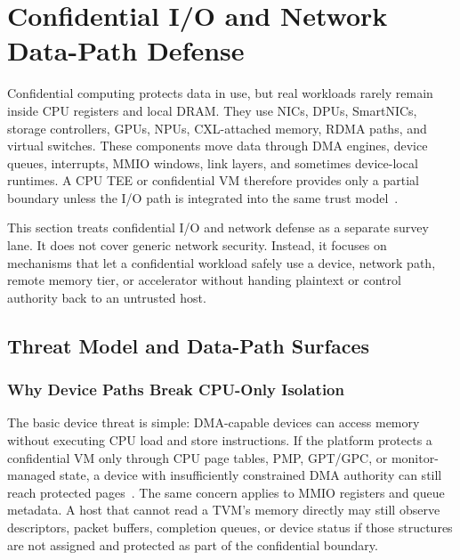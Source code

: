\section{Confidential I/O and Network Data-Path Defense}

Confidential computing protects data in use, but real workloads rarely remain
inside CPU registers and local DRAM. They use NICs, DPUs, SmartNICs, storage
controllers, GPUs, NPUs, CXL-attached memory, RDMA paths, and virtual switches.
These components move data through DMA engines, device queues, interrupts,
MMIO windows, link layers, and sometimes device-local runtimes. A CPU TEE or
confidential VM therefore provides only a partial boundary unless the I/O path
is integrated into the same trust model~\cite{riscv_cove_io_2026,arm_smmu_spec,sok-tee,zhu2020hetee,dhar2024cloudscale,zhou2024snic,giantsidi2025tnic}.

This section treats confidential I/O and network defense as a separate survey
lane. It does not cover generic network security. Instead, it focuses on
mechanisms that let a confidential workload safely use a device, network path,
remote memory tier, or accelerator without handing plaintext or control
authority back to an untrusted host.

\subsection{Threat Model and Data-Path Surfaces}

\subsubsection{Why Device Paths Break CPU-Only Isolation}

The basic device threat is simple: DMA-capable devices can access memory
without executing CPU load and store instructions. If the platform protects a
confidential VM only through CPU page tables, PMP, GPT/GPC, or monitor-managed
state, a device with insufficiently constrained DMA authority can still reach
protected pages~\cite{arm_smmu_spec,riscv_iommu_2023,riscv_iopmp_2026}. The
same concern applies to MMIO registers and queue metadata. A host that cannot
read a TVM's memory directly may still observe descriptors, packet buffers,
completion queues, or device status if those structures are not assigned and
protected as part of the confidential boundary.

